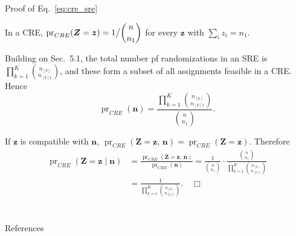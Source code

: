 \documentclass[aspectratio=169, 12pt]{beamer}
\begin{document}
\begin{frame}[label=pf-cre_sre]{Proof of Eq.~\eqref{eq:cre_sre}}
  \footnotesize

  In a CRE, $\operatorname{pr}_{CRE}(\bm{Z}=\bm{z}) = 1\big/\dbinom{n}{n_1}$
  for every $\bm{z}$ with $\sum_i z_i = n_1$.

  Building on Sec.~5.1, the total number pf randomizations in an SRE is $\prod_{k=1}^{K}\binom{n_{[k]}}{n_{[k]1}}$, and these form
  a subset of all assignments feasible in a CRE. Hence
  \[
    \operatorname{pr}_{CRE}(\bm{n})
    = \frac{\prod_{k=1}^{K}\binom{n_{[k]}}{n_{[k]1}}}{\binom{n}{n_1}}.
  \]

  If $\bm{z}$ is compatible with $\bm{n}$, $\operatorname{pr}_{CRE}(\bm{Z}=\bm{z},\,\bm{n})
  = \operatorname{pr}_{CRE}(\bm{Z}=\bm{z})$. Therefore
  \begin{align*}
    \operatorname{pr}_{CRE}(\bm{Z}=\bm{z}\mid \bm{n})
    &= \frac{\operatorname{pr}_{CRE}(\bm{Z}=\bm{z},\,\bm{n})}
            {\operatorname{pr}_{CRE}(\bm{n})}
     = \frac{1}{\binom{n}{n_1}}
       \cdot \frac{\binom{n}{n_1}}{\prod_{k=1}^{K}\binom{n_{[k]}}{n_{[k]1}}}\\[4pt]
    &= \frac{1}{\prod_{k=1}^{K}\binom{n_{[k]}}{n_{[k]1}}}. \quad \Box
  \end{align*}

  \vfill
  \hfill\hyperlink{cre_sre<1>}{}
\end{frame}



\section{}
\begin{frame}{References}
  \beamerdefaultoverlayspecification{}
  \small
  
\end{frame}
\end{document}
